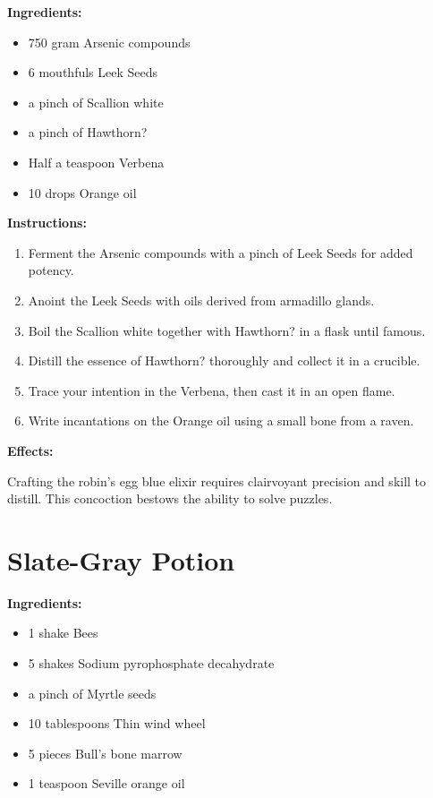 \documentclass{article}
\begin{document}
\textbf{Ingredients:}

\begin{itemize}
  \item 750 gram Arsenic compounds
  \item 6 mouthfuls Leek Seeds
  \item a pinch of Scallion white
  \item a pinch of Hawthorn?
  \item Half a teaspoon Verbena
  \item 10 drops Orange oil
\end{itemize}

\textbf{Instructions:}

\begin{enumerate}
  \item Ferment the Arsenic compounds with a pinch of Leek Seeds for added potency.
  \item Anoint the Leek Seeds with oils derived from armadillo glands.
  \item Boil the Scallion white together with Hawthorn? in a flask until famous.
  \item Distill the essence of Hawthorn? thoroughly and collect it in a crucible.
  \item Trace your intention in the Verbena, then cast it in an open flame.
  \item Write incantations on the Orange oil using a small bone from a raven.
\end{enumerate}

\textbf{Effects:}

Crafting the robin's egg blue elixir requires clairvoyant precision and skill to distill. This concoction bestows the ability to solve puzzles.

\newpage
\section*{Slate-Gray Potion}

\textbf{Ingredients:}

\begin{itemize}
  \item 1 shake Bees
  \item 5 shakes Sodium pyrophosphate decahydrate
  \item a pinch of Myrtle seeds
  \item 10 tablespoons Thin wind wheel
  \item 5 pieces Bull's bone marrow
  \item 1 teaspoon Seville orange oil
\end{itemize}
\end{document}
